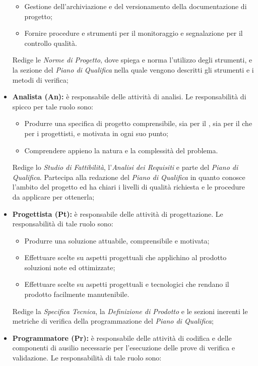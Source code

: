 \begin{itemize}
\begin{itemize}
				\item Gestione dell'archiviazione e del versionamento della documentazione di progetto;
				\item Fornire procedure e strumenti per il monitoraggio e segnalazione per il controllo
qualità. \\
			\end{itemize}
			Redige le \textit{Norme di Progetto}, dove spiega e norma l'utilizzo degli strumenti, e la sezione del \textit{Piano di Qualifica} nella quale vengono descritti gli strumenti e i metodi di verifica;
			\item \textbf{Analista (An):} è responsabile delle attività di analisi. Le responsabilità di spicco per tale ruolo sono: \\
			\begin{itemize}
				\item Produrre una specifica di progetto comprensibile, sia per il , sia per il  che per i progettisti, e motivata in ogni suo punto;
				\item  Comprendere appieno la natura e la complessità del problema. \\
			\end{itemize}
			Redige lo \textit{Studio di Fattibilità}, l'\textit{Analisi dei Requisiti} e parte del \textit{Piano di Qualifica}. Partecipa alla redazione del \textit{Piano di Qualifica} in quanto conosce l'ambito del progetto ed ha chiari i livelli di qualità richiesta e le procedure da applicare per ottenerla;
			\item \textbf{Progettista (Pt):} è responsabile delle attività di progettazione.
Le responsabilità di tale ruolo sono: \\
			\begin{itemize}
				\item Produrre una soluzione attuabile, comprensibile e motivata;
				\item Effettuare scelte su aspetti progettuali che applichino al prodotto soluzioni
note ed ottimizzate;
				\item Effettuare scelte su aspetti progettuali e tecnologici che rendano il prodotto
facilmente manutenibile. \\
			\end{itemize}
			Redige la \textit{Specifica Tecnica}, la \textit{Definizione di Prodotto} e le sezioni inerenti le metriche di verifica della programmazione del \textit{Piano di Qualifica};
			\item \textbf{Programmatore (Pr):} è responsabile delle attività di codifica e delle componenti di ausilio necessarie per l'esecuzione delle prove di verifica e validazione. Le responsabilità di tale ruolo sono: \\

\end{itemize}
